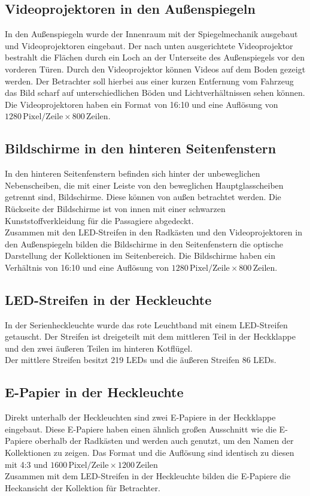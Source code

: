 \subsection{Videoprojektoren in den Außenspiegeln}
In den Außenspiegeln wurde der Innenraum mit der Spiegelmechanik ausgebaut und Videoprojektoren eingebaut. Der nach unten ausgerichtete Videoprojektor bestrahlt die Flächen durch ein Loch an der Unterseite des Außenspiegels vor den vorderen Türen.
Durch den Videoprojektor können Videos auf dem Boden gezeigt werden. Der Betrachter soll hierbei aus einer kurzen Entfernung vom Fahrzeug das Bild scharf auf unterschiedlichen Böden und Lichtverhältnissen sehen können. \\
Die Videoprojektoren haben ein Format von 16:10 und eine Auflösung von $ 1280\,\mathrm{Pixel}/\mathrm{Zeile} \times 800\,\mathrm{Zeilen} $.
\subsection{Bildschirme in den hinteren Seitenfenstern}
In den hinteren Seitenfenstern befinden sich hinter der unbeweglichen Nebenscheiben, die mit einer Leiste von den beweglichen Hauptglasscheiben getrennt sind, Bildschirme. Diese können von außen betrachtet werden. Die Rückseite der Bildschirme ist von innen mit einer schwarzen Kunststoffverkleidung für die Passagiere abgedeckt.\\
Zusammen mit den LED-Streifen in den Radkästen und den Videoprojektoren in den Außenspiegeln bilden die Bildschirme in den Seitenfenstern die optische Darstellung der Kollektionen im Seitenbereich.
Die Bildschirme haben ein Verhältnis von 16:10 und eine Auflösung von $ 1280\,\mathrm{Pixel}/\mathrm{Zeile} \times 800 \,\mathrm{Zeilen} $.
\subsection{LED-Streifen in der Heckleuchte}
In der Serienheckleuchte wurde das rote Leuchtband mit einem LED-Streifen getauscht. Der Streifen ist dreigeteilt mit dem mittleren Teil in der Heckklappe und den zwei äußeren Teilen im hinteren Kotflügel. \\
Der mittlere Streifen besitzt 219 LEDs und die äußeren Streifen 86 LEDs.
\subsection{E-Papier in der Heckleuchte}
Direkt unterhalb der Heckleuchten sind zwei E-Papiere in der Heckklappe eingebaut.
Diese E-Papiere haben einen ähnlich großen Ausschnitt wie die E-Papiere oberhalb der Radkästen und werden auch genutzt, um den Namen der Kollektionen zu zeigen. Das Format und die Auflösung sind identisch zu diesen mit 4:3 und $ 1600 \,\mathrm{Pixel}/\mathrm{Zeile} \times 1200\,\mathrm{Zeilen} $\\
Zusammen mit dem LED-Streifen in der Heckleuchte bilden die E-Papiere die Heckansicht der Kollektion für Betrachter.

